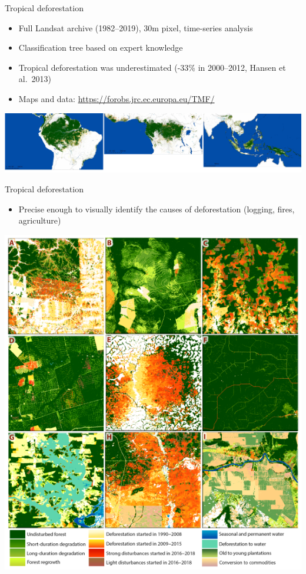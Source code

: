 \documentclass[10pt,table,dvipsnames,compress]{beamer}
\begin{document}
\begin{frame}[label={sec:org97f6835}]{Tropical deforestation}
\begin{itemize}
\item Full Landsat archive (1982--2019), 30m pixel, time-series analysis
\item Classification tree based on expert knowledge
\item Tropical deforestation was underestimated (-33\% in 2000--2012, Hansen
et al. 2013)
\item Maps and data: \url{https://forobs.jrc.ec.europa.eu/TMF/}
\end{itemize}

\vspace{0.25cm}
\centering \includegraphics[width=\textwidth]{figs/Vancutsem2021-maps-wide}
\end{frame}

\begin{frame}[label={sec:orgbbf4ebb}]{Tropical deforestation}
\begin{itemize}
\item Precise enough to visually identify the causes of deforestation
(logging, fires, agriculture)
\end{itemize}

\centering \includegraphics[height=0.7\textheight]{figs/Vancutsem2021-patterns}
\end{frame}
\end{document}
